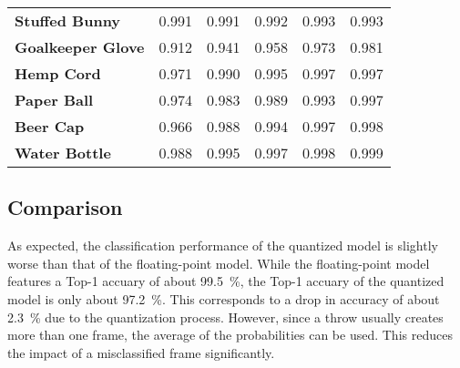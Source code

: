\begin{table}
\begin{tabular}{llllll}
    \textbf{Stuffed Bunny} & \num{0.991} & \num{0.991} & \num{0.992} & \num{0.993} & \num{0.993} \\
    \textbf{Goalkeeper Glove} & \num{0.912} & \num{0.941} & \num{0.958} & \num{0.973} & \num{0.981} \\
    \textbf{Hemp Cord} & \num{0.971} & \num{0.990} & \num{0.995} & \num{0.997} & \num{0.997} \\
    \textbf{Paper Ball} & \num{0.974} & \num{0.983} & \num{0.989} & \num{0.993} & \num{0.997} \\
    \textbf{Beer Cap} & \num{0.966} & \num{0.988} & \num{0.994} & \num{0.997} & \num{0.998} \\
    \textbf{Water Bottle} & \num{0.988} & \num{0.995} & \num{0.997} & \num{0.998} & \num{0.999} \\
    \bottomrule
  \end{tabular}
\end{table}

\subsection{Comparison}
\label{subsec:verification_and_benchmark:classification_performance:comparison}

As expected, the classification performance of the quantized model is slightly worse than that of the floating-point model.
While the floating-point model features a Top-1 accuary of about \SI{99.5}{\percent}, the Top-1 accuary of the quantized model is only about \SI{97.2}{\percent}.
This corresponds to a drop in accuracy of about \SI{2.3}{\percent} due to the quantization process.
However, since a throw usually creates more than one frame, the average of the probabilities can be used.
This reduces the impact of a misclassified frame significantly.

